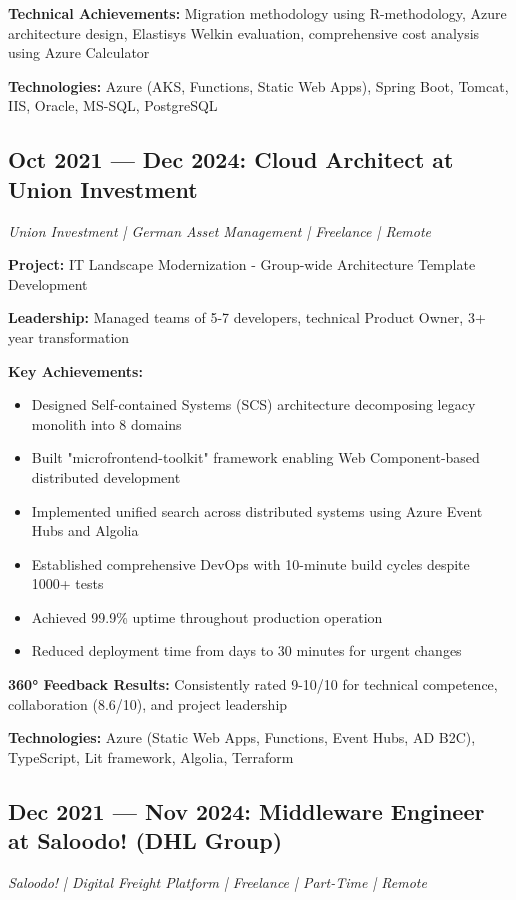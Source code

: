 \documentclass[10pt,a4paper]{article}
\newenvironment{compactlist}{\begin{itemize}[leftmargin=1em,itemsep=0pt,parsep=0pt,topsep=0pt,partopsep=0pt]}{\end{itemize}}
\begin{document}
\textbf{Technical Achievements:} Migration methodology using R-methodology, Azure architecture design, Elastisys Welkin evaluation, comprehensive cost analysis using Azure Calculator

\textbf{Technologies:} Azure (AKS, Functions, Static Web Apps), Spring Boot, Tomcat, IIS, Oracle, MS-SQL, PostgreSQL

\subsection{Oct 2021 — Dec 2024: Cloud Architect at Union Investment}
\textit{Union Investment | German Asset Management | Freelance | Remote}

\textbf{Project:} IT Landscape Modernization - Group-wide Architecture Template Development

\textbf{Leadership:} Managed teams of 5-7 developers, technical Product Owner, 3+ year transformation

\textbf{Key Achievements:}
\begin{compactlist}
\item Designed Self-contained Systems (SCS) architecture decomposing legacy monolith into 8 domains
\item Built "microfrontend-toolkit" framework enabling Web Component-based distributed development
\item Implemented unified search across distributed systems using Azure Event Hubs and Algolia
\item Established comprehensive DevOps with 10-minute build cycles despite 1000+ tests
\item Achieved 99.9\% uptime throughout production operation
\item Reduced deployment time from days to 30 minutes for urgent changes
\end{compactlist}

\textbf{360° Feedback Results:} Consistently rated 9-10/10 for technical competence, collaboration (8.6/10), and project leadership

\textbf{Technologies:} Azure (Static Web Apps, Functions, Event Hubs, AD B2C), TypeScript, Lit framework, Algolia, Terraform

\subsection{Dec 2021 — Nov 2024: Middleware Engineer at Saloodo! (DHL Group)}
\textit{Saloodo! | Digital Freight Platform | Freelance | Part-Time | Remote}
\end{document}

